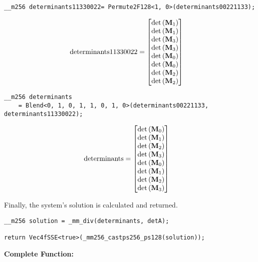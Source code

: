 \begin{verbatim}
__m256 determinants11330022= Permute2F128<1, 0>(determinants00221133);
\end{verbatim} 
\begin{align*}
\mathrm{determinants11330022} 
&=
\begin{bmatrix}
\mathrm{det}\left(\mathbf{M}_1\right)\\
\mathrm{det}\left(\mathbf{M}_1\right)\\
\mathrm{det}\left(\mathbf{M}_3\right)\\
\mathrm{det}\left(\mathbf{M}_3\right)\\
\mathrm{det}\left(\mathbf{M}_0\right)\\
\mathrm{det}\left(\mathbf{M}_0\right)\\
\mathrm{det}\left(\mathbf{M}_2\right)\\
\mathrm{det}\left(\mathbf{M}_2\right)\\
\end{bmatrix}
\end{align*}

\begin{verbatim}
__m256 determinants 
    = Blend<0, 1, 0, 1, 1, 0, 1, 0>(determinants00221133, determinants11330022);
\end{verbatim} 
\begin{align*}
\mathrm{determinants} 
&=
\begin{bmatrix}
\mathrm{det}\left(\mathbf{M}_0\right)\\
\mathrm{det}\left(\mathbf{M}_1\right)\\
\mathrm{det}\left(\mathbf{M}_2\right)\\
\mathrm{det}\left(\mathbf{M}_3\right)\\
\mathrm{det}\left(\mathbf{M}_0\right)\\
\mathrm{det}\left(\mathbf{M}_1\right)\\
\mathrm{det}\left(\mathbf{M}_2\right)\\
\mathrm{det}\left(\mathbf{M}_3\right)\\
\end{bmatrix}
\end{align*}

Finally, the system's solution is calculated and returned.

\begin{verbatim}
__m256 solution = _mm_div(determinants, detA);

return Vec4fSSE<true>(_mm256_castps256_ps128(solution));
\end{verbatim}


\vspace{1cm}
\textbf{Complete Function:}

